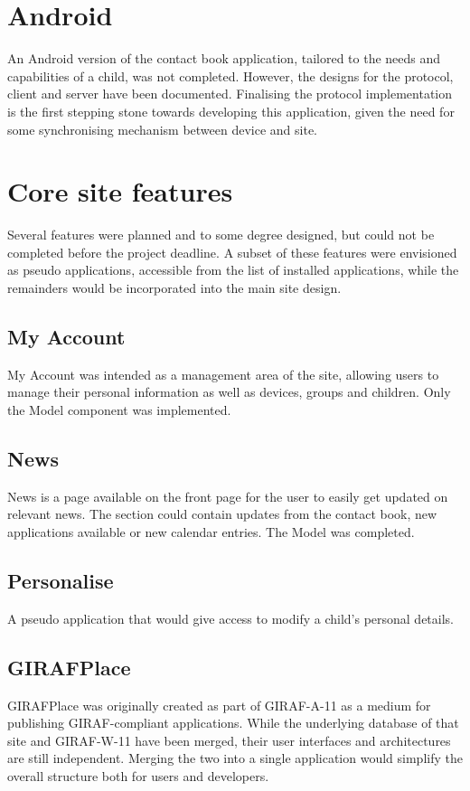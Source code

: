 \section{Android}
%
\label{androidReflection}
An Android version of the contact book application, tailored to the needs and capabilities of a child, was not completed. However, the designs for the protocol, client and server have been documented. Finalising the protocol implementation is the first stepping stone towards developing this application, given the need for some synchronising mechanism between device and site.

\section{Core site features}
Several features were planned and to some degree designed, but could not be completed before the project deadline. A subset of these features were envisioned as pseudo applications, accessible from the list of installed applications, while the remainders would be incorporated into the main site design.

\subsection*{My Account}
My Account was intended as a management area of the site, allowing users to manage their personal information as well as devices, groups and children. Only the Model component was implemented.

\subsection*{News}
News is a page available on the front page for the user to easily get updated on relevant news. The section could contain updates from the contact book, new applications available or new calendar entries. The Model was completed.

\subsection*{Personalise}
A pseudo application that would give access to modify a child's personal details.

\subsection*{GIRAFPlace}
GIRAFPlace was originally created as part of GIRAF-A-11 as a medium for publishing GIRAF-compliant applications. While the underlying database of that site and GIRAF-W-11 have been merged, their user interfaces and architectures are still independent. Merging the two into a single application would simplify the overall structure both for users and developers.

